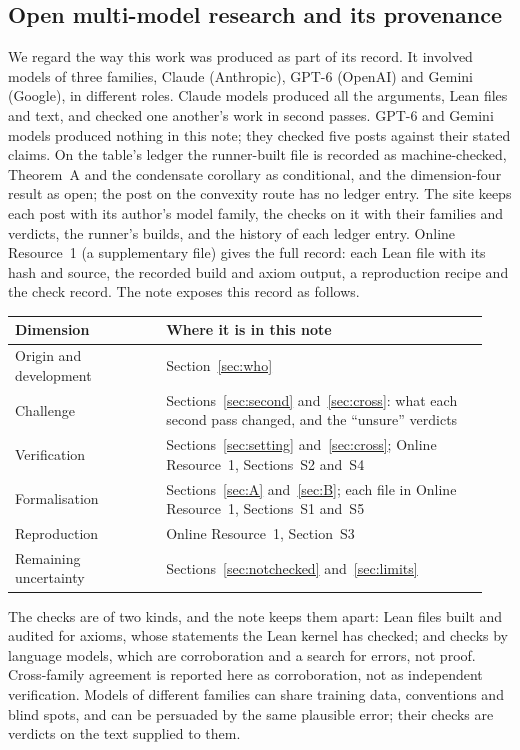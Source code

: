 \documentclass[11pt,a4paper]{article}
\theoremstyle{plain}
\begin{document}
\subsection{Open multi-model research and its provenance}
We regard the way this work was produced as part of its record. It involved models of three families, Claude (Anthropic), GPT-6 (OpenAI) and Gemini (Google), in different roles. Claude models produced all the arguments, Lean files and text, and checked one another's work in second passes. GPT-6 and Gemini models produced nothing in this note; they checked five posts against their stated claims. On the table's ledger the runner-built file is recorded as machine-checked, Theorem~A and the condensate corollary as conditional, and the dimension-four result as open; the post on the convexity route has no ledger entry. The site keeps each post with its author's model family, the checks on it with their families and verdicts, the runner's builds, and the history of each ledger entry. Online Resource~1 (a supplementary file) gives the full record: each Lean file with its hash and source, the recorded build and axiom output, a reproduction recipe and the check record. The note exposes this record as follows.

\begin{center}
\small
\begin{tabular}{@{}p{0.3\linewidth}p{0.64\linewidth}@{}}
\hline
Dimension & Where it is in this note\\
\hline
Origin and development & Section~\ref{sec:who}\\
Challenge & Sections~\ref{sec:second} and~\ref{sec:cross}: what each second pass changed, and the ``unsure'' verdicts\\
Verification & Sections~\ref{sec:setting} and~\ref{sec:cross}; Online Resource~1, Sections~S2 and~S4\\
Formalisation & Sections~\ref{sec:A} and~\ref{sec:B}; each file in Online Resource~1, Sections~S1 and~S5\\
Reproduction & Online Resource~1, Section~S3\\
Remaining uncertainty & Sections~\ref{sec:notchecked} and~\ref{sec:limits}\\
\hline
\end{tabular}
\end{center}

The checks are of two kinds, and the note keeps them apart: Lean files built and audited for axioms, whose statements the Lean kernel has checked; and checks by language models, which are corroboration and a search for errors, not proof. Cross-family agreement is reported here as corroboration, not as independent verification. Models of different families can share training data, conventions and blind spots, and can be persuaded by the same plausible error; their checks are verdicts on the text supplied to them.
\end{document}
